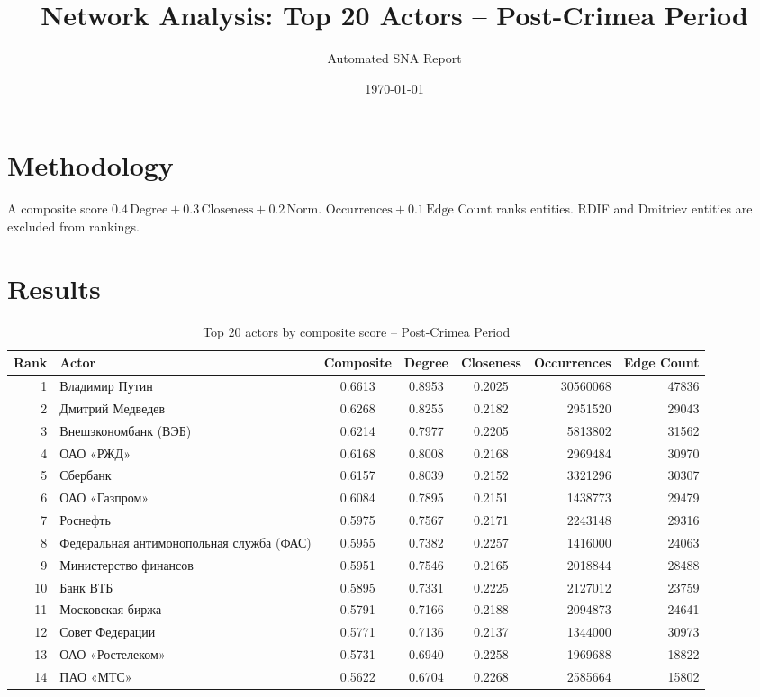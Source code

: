 \documentclass[11pt,a4paper]{article}
\title{Network Analysis: Top 20 Actors -- Post-Crimea Period}
\author{Automated SNA Report}
\date{\today}
\begin{document}
\maketitle
\section{Methodology}
A composite score $0.4\,\text{Degree}+0.3\,\text{Closeness}+0.2\,\text{Norm.\ Occurrences}+0.1\,\text{Edge Count}$ ranks entities. RDIF and Dmitriev entities are excluded from rankings.
\section{Results}
\begin{table}[htbp]
\centering
\caption{Top 20 actors by composite score -- Post-Crimea Period}
\label{tab:top20}
\begin{tabular}{r l S[table-format=1.4] S[table-format=1.4] S[table-format=1.4] r r}
\toprule
Rank & Actor & {Composite} & {Degree} & {Closeness} & Occurrences & {Edge Count}\\
 & Владимир Путин & 0.6613 & 0.8953 & 0.2025 & 30560068 & 47836 \\
2 & Дмитрий Медведев & 0.6268 & 0.8255 & 0.2182 & 2951520 & 29043 \\
3 & Внешэкономбанк (ВЭБ) & 0.6214 & 0.7977 & 0.2205 & 5813802 & 31562 \\
4 & ОАО «РЖД» & 0.6168 & 0.8008 & 0.2168 & 2969484 & 30970 \\
5 & Сбербанк & 0.6157 & 0.8039 & 0.2152 & 3321296 & 30307 \\
6 & ОАО «Газпром» & 0.6084 & 0.7895 & 0.2151 & 1438773 & 29479 \\
7 & Роснефть & 0.5975 & 0.7567 & 0.2171 & 2243148 & 29316 \\
8 & Федеральная антимонопольная служба (ФАС) & 0.5955 & 0.7382 & 0.2257 & 1416000 & 24063 \\
9 & Министерство финансов & 0.5951 & 0.7546 & 0.2165 & 2018844 & 28488 \\
10 & Банк ВТБ & 0.5895 & 0.7331 & 0.2225 & 2127012 & 23759 \\
11 & Московская биржа & 0.5791 & 0.7166 & 0.2188 & 2094873 & 24641 \\
12 & Совет Федерации & 0.5771 & 0.7136 & 0.2137 & 1344000 & 30973 \\
13 & ОАО «Ростелеком» & 0.5731 & 0.6940 & 0.2258 & 1969688 & 18822 \\
14 & ПАО «МТС» & 0.5622 & 0.6704 & 0.2268 & 2585664 & 15802 \\

\end{tabular}
\end{table}
\end{document}
